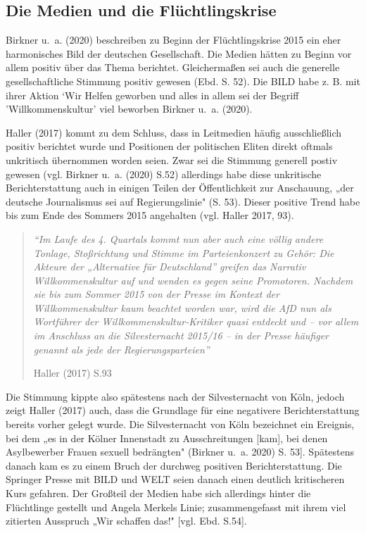 \documentclass[
  11pt,
]{article}
\begin{document}
\hypertarget{die-medien-und-die-fluxfcchtlingskrise}{%
\subsection{Die Medien und die
Flüchtlingskrise}\label{die-medien-und-die-fluxfcchtlingskrise}}

Birkner u.~a. (2020) beschreiben zu Beginn der Flüchtlingskrise 2015 ein
eher harmonisches Bild der deutschen Gesellschaft. Die Medien hätten zu
Beginn vor allem positiv über das Thema berichtet. Gleichermaßen sei
auch die generelle gesellschaftliche Stimmung positiv gewesen (Ebd. S.
52). Die BILD habe z. B. mit ihrer Aktion `Wir Helfen\textquotesingle{}
geworben und alles in allem sei der Begriff 'Willkommenskultur' viel
beworben Birkner u.~a. (2020).

Haller (2017) kommt zu dem Schluss, dass in Leitmedien häufig
ausschließlich positiv berichtet wurde und Positionen der politischen
Eliten direkt oftmals unkritisch übernommen worden seien. Zwar sei die
Stimmung generell postiv gewesen (vgl. Birkner u.~a. (2020) S.52)
allerdings habe diese unkritische Berichterstattung auch in einigen
Teilen der Öffentlichkeit zur Anschauung, „der deutsche Journalismus sei
auf Regierungslinie" (S. 53). Dieser positive Trend habe bis zum Ende
des Sommers 2015 angehalten (vgl. Haller 2017, 93).

\begin{quote}
\emph{``Im Laufe des 4. Quartals kommt nun aber auch eine völlig andere
Tonlage, Stoßrichtung und Stimme im Parteienkonzert zu Gehör: Die
Akteure der „Alternative für Deutschland'' greifen das Narrativ
Willkommenskultur auf und wenden es gegen seine Promotoren. Nachdem sie
bis zum Sommer 2015 von der Presse im Kontext der Willkommenskultur kaum
beachtet worden war, wird die AfD nun als Wortführer der
Willkommenskultur-Kritiker quasi entdeckt und -- vor allem im Anschluss
an die Silvesternacht 2015/16 -- in der Presse häufiger genannt als jede
der Regierungsparteien''}

Haller (2017) S.93
\end{quote}

Die Stimmung kippte also spätestens nach der Silvesternacht von Köln,
jedoch zeigt Haller (2017) auch, dass die Grundlage für eine negativere
Berichterstattung bereits vorher gelegt wurde. Die Silvesternacht von
Köln bezeichnet ein Ereignis, bei dem „es in der Kölner Innenstadt zu
Ausschreitungen {[}kam{]}, bei denen Asylbewerber Frauen sexuell
bedrängten" (Birkner u.~a. 2020) S. 53{]}. Spätestens danach kam es zu
einem Bruch der durchweg positiven Berichterstattung. Die Springer
Presse mit BILD und WELT seien danach einen deutlich kritischeren Kurs
gefahren. Der Großteil der Medien habe sich allerdings hinter die
Flüchtlinge gestellt und Angela Merkels Linie; zusammengefasst mit ihrem
viel zitierten Ausspruch „Wir schaffen das!" {[}vgl. Ebd. S.54{]}.
\end{document}
